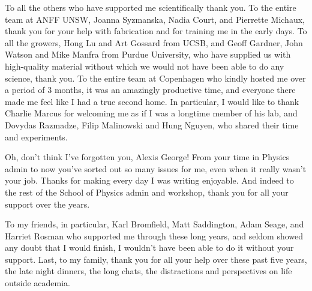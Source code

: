 To all the others who have supported me scientifically thank you. To the entire team at ANFF UNSW, Joanna Syzmanska, Nadia Court,
and Pierrette Michaux, thank you for your help with fabrication and for training me in the early days. To all the growers, Hong Lu and Art Gossard
from UCSB, and Geoff Gardner, John Watson and Mike Manfra from Purdue University, who have supplied us with high-quality material without
which we would not have been able to do any science, thank you. To the entire team at Copenhagen who kindly hosted me over a period of
3 months, it was an amazingly productive time, and everyone there made me feel like I had a true second home. In particular, I would like to
thank Charlie Marcus for welcoming me as if I was a longtime member of his lab, and Dovydas Razmadze, Filip Malinowski and Hung Nguyen,
who shared their time and experiments.

Oh, don't think I've forgotten you, Alexis George! From your time in Physics admin to now you've sorted out so many issues for me, even
when it really wasn't your job. Thanks for making every day I was writing enjoyable. And indeed to the rest of the School of Physics
admin and workshop, thank you for all your support over the years.

To my friends, in particular, Karl Bromfield, Matt Saddington, Adam Seage, and Harriet Rosman who supported me through these long years,
and seldom showed any doubt that I would finish, I wouldn't have been able to do it without your support. Last, to my family,
thank you for all your help over these past five years, the late night dinners, the long chats, the distractions and perspectives on life outside
academia.
